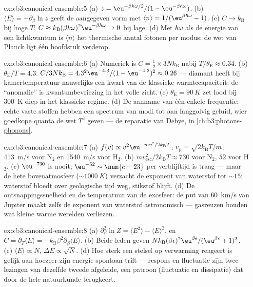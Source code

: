 \begin{solution}{exo:b3:canonical-ensemble:5}
(a) $z = \eu^{-\beta\hbar\omega/2}/(1 - \eu^{-\beta\hbar\omega})$.
(b) $\langle E\rangle = -\partial_\beta\ln z$ geeft de aangegeven vorm met
$\langle n\rangle = 1/(\eu^{\beta\hbar\omega} - 1)$. (c)
$C \to k_{\text{B}}$ bij hoge $T$; $C \approx k_{\text{B}}(\beta
\hbar\omega)^2\eu^{-\beta\hbar\omega} \to 0$ bij lage. (d) Met
$\hbar\omega$ als de energie van een lichtkwantum is $\langle n\rangle$
het thermische aantal fotonen per modus: de wet van Planck ligt één
hoofdstuk verderop.
\end{solution}

\begin{solution}{exo:b3:canonical-ensemble:6}
(a) Numeriek is $C = \tfrac12 \times 3Nk_{\text{B}}$ nabij
$T/\theta_{\text{E}} \approx 0.34$. (b) $\theta_{\text{E}}/T =
4.3$: $C/3Nk_{\text{B}} = 4.3^2\eu^{-4.3}/(1 - \eu^{-4.3})^2
\approx 0.26$ --- diamant heeft bij kamertemperatuur nauwelijks een kwart
van de klassieke warmtecapaciteit: de ``anomalie'' is kwantumbevriezing in
het volle zicht. (c) $\theta_{\text{E}} = \qty{90}{K}$ zet lood bij
\qty{300}{K} diep in het klassieke regime. (d) De aanname van één enkele
frequentie: echte vaste stoffen hebben een spectrum van modi tot aan
langgolvig geluid, wier goedkope quanta de wet $T^3$ geven --- de
reparatie van Debye, in \cref{ch:b3:photons-phonons}.
\end{solution}

\begin{solution}{exo:b3:canonical-ensemble:7}
(a) $f(v) \propto v^2\eu^{-mv^2/2k_{\text{B}}T}$: $v_{\text{p}} =
\sqrt{2k_{\text{B}}T/m}$: \qty{413}{m/s} voor N$_2$ en
\qty{1540}{m/s} voor H$_2$. (b) $mv_{\text{esc}}^2/2k_{\text{B}}T
\approx 730$ voor N$_2$, $52$ voor H$_2$. (c) $\eu^{-730}$ is nooit;
$\eu^{-52} \sim \num{e-23}$ per verblijftijd is traag --- maar de hete
bovenatmosfeer ($\sim\qty{1000}{K}$) verzacht de exponent van waterstof
tot $\sim15$: waterstof bloedt over geologische tijd weg, stikstof blijft.
(d) De ontsnappingssnelheid en de temperatuur van de exosfeer: de put van
\qty{60}{km/s} van Jupiter maakt zelfs de exponent van waterstof
astronomisch --- gasreuzen houden wat kleine warme werelden verliezen.
\end{solution}

\begin{solution}{exo:b3:canonical-ensemble:8}
(a) $\partial_\beta^2\ln Z = \langle E^2\rangle - \langle
E\rangle^2$, en $C = \partial_T\langle E\rangle =
-k_{\text{B}}\beta^2\partial_\beta\langle E\rangle$. (b) Beide leden geven
$Nk_{\text{B}}(\beta\epsilon)^2\eu^{\beta\epsilon}/(
\eu^{\beta\epsilon} + 1)^2$. (c) $\langle E\rangle \propto N$,
$\Delta E \propto \sqrt N$. (d) Hoe sterk een stelsel op verwarming
reageert is gelijk aan hoezeer zijn energie spontaan trilt --- respons en
fluctuatie zijn twee lezingen van dezelfde tweede afgeleide, een patroon
(fluctuatie en dissipatie) dat door de hele natuurkunde terugkeert.
\end{solution}

